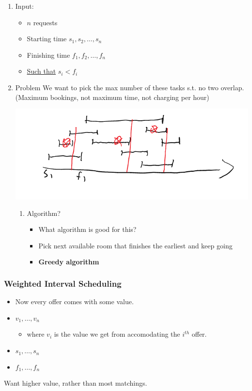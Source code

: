 \documentclass[11pt]{article}
\begin{document}
\begin{enumerate}
\item Input:
\label{sec:org8ec0ee9}
\begin{itemize}
\item \(n\) requests
\item Starting time \(s_1, s_2, \ldots , s_n\)
\item Finishing time \(f_1, f_2, \ldots, f_n\)
\item \uline{Such that} \(s_i<f_i\)
\end{itemize}

\item Problem
\label{sec:orgbd07e3b}
We want to pick the max number of these tasks s.t. no two overlap. (Maximum bookings, not maximum time, not charging per hour)
\begin{center}
\includegraphics[width=.9\linewidth]{./Images/i2.png}
\end{center}
\begin{enumerate}
\item Algorithm?
\label{sec:org09fb6d6}
\begin{itemize}
\item What algorithm is good for this?
\item Pick next available room that finishes the earliest and keep going
\item \textbf{Greedy algorithm}
\end{itemize}
\end{enumerate}
\end{enumerate}
\subsubsection{Weighted Interval Scheduling}
\label{sec:org19d3396}
\begin{itemize}
\item Now every offer comes with some value.
\item \(v_1,\ldots,v_n\)
\begin{itemize}
\item where \(v_i\) is the value we get from accomodating the \(i^{th}\) offer.
\end{itemize}
\item \(s_1,\ldots,s_n\)
\item \(f_1,\ldots,f_n\)
\end{itemize}
Want higher value, rather than most matchings.
\end{document}
